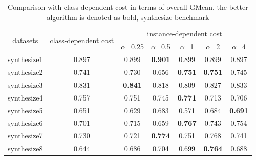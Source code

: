 \documentclass{article}
\begin{document}
\begin{table}[!ht]
	\centering
	\begin{tabular}{|c||c|ccccc|}
		\hline
		\multirow{2}{*}{datasets} & \multirow{2}{*}{class-dependent cost} & \multicolumn{5}{c|}{instance-dependent cost}                                                                                                                           \\ \cline{3-7} 
		&                                       & \multicolumn{1}{c|}{$\alpha$=0.25}         & \multicolumn{1}{c|}{$\alpha$=0.5}          & \multicolumn{1}{c|}{$\alpha$=1}            & \multicolumn{1}{c|}{$\alpha$=2}            & $\alpha$=4            \\ \hline \hline
		synthesize1               & 0.897                                 & \multicolumn{1}{c|}{0.899}          & \multicolumn{1}{c|}{\textbf{0.901}} & \multicolumn{1}{c|}{0.899}          & \multicolumn{1}{c|}{0.899}          & 0.897          \\ \hline
		synthesize2               & 0.741                                 & \multicolumn{1}{c|}{0.730}          & \multicolumn{1}{c|}{0.656}          & \multicolumn{1}{c|}{\textbf{0.751}} & \multicolumn{1}{c|}{\textbf{0.751}} & 0.745          \\ \hline
		synthesize3               & 0.831                                 & \multicolumn{1}{c|}{\textbf{0.841}} & \multicolumn{1}{c|}{0.818}          & \multicolumn{1}{c|}{0.809}          & \multicolumn{1}{c|}{0.827}          & 0.833          \\ \hline
		synthesize4               & 0.757                                 & \multicolumn{1}{c|}{0.751}          & \multicolumn{1}{c|}{0.745}          & \multicolumn{1}{c|}{\textbf{0.771}} & \multicolumn{1}{c|}{0.713}          & 0.706          \\ \hline
		synthesize5               & 0.651                                 & \multicolumn{1}{c|}{0.629}          & \multicolumn{1}{c|}{0.683}          & \multicolumn{1}{c|}{0.571}          & \multicolumn{1}{c|}{0.684}          & \textbf{0.691} \\ \hline
		synthesize6               & 0.701                                 & \multicolumn{1}{c|}{0.715}          & \multicolumn{1}{c|}{0.659}          & \multicolumn{1}{c|}{\textbf{0.767}} & \multicolumn{1}{c|}{0.743}          & 0.754          \\ \hline
		synthesize7               & 0.730                                 & \multicolumn{1}{c|}{0.721}          & \multicolumn{1}{c|}{\textbf{0.774}} & \multicolumn{1}{c|}{0.751}          & \multicolumn{1}{c|}{0.768}          & 0.741          \\ \hline
		synthesize8               & 0.644                                 & \multicolumn{1}{c|}{0.686}          & \multicolumn{1}{c|}{0.704}          & \multicolumn{1}{c|}{0.699}          & \multicolumn{1}{c|}{\textbf{0.764}}          & 0.688          \\ \hline
	\end{tabular}
	\label{tab01:overall}
	\caption{Comparison with class-dependent cost in terms of overall GMean, the better algorithm is denoted as bold, synthesize benchmark}
\end{table}
\end{document}
